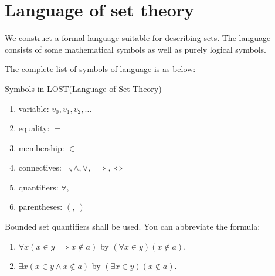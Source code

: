 \section{Language of set theory}

We construct a formal language suitable for describing sets. The language consists of some mathematical symbols as well as purely logical symbols.

The complete list of symbols of language is as below:
\begin{definition}{Symbols in LOST(Language of Set Theory)}{}
    \begin{enumerate}
        \item variable: $v_0, v_1, v_2, \ldots$
        \item equality: $=$
        \item membership: $\in$
        \item connectives: $\neg, \land, \lor, \implies, \iff$
        \item quantifiers: $\forall, \exists$
        \item parentheses: $\left(,\ \right)$
    \end{enumerate}
\end{definition}

\begin{remarks}
    Bounded set quantifiers shall be used. You can abbreviate the formula:
    \begin{enumerate}
        \item $\forall x (x \in y \implies x \notin a)$ by $(\forall x \in y) (x \notin a).$
        \item $\exists x (x \in y \land x \notin a)$ by $(\exists x \in y) (x \notin a).$
    \end{enumerate}
\end{remarks}

